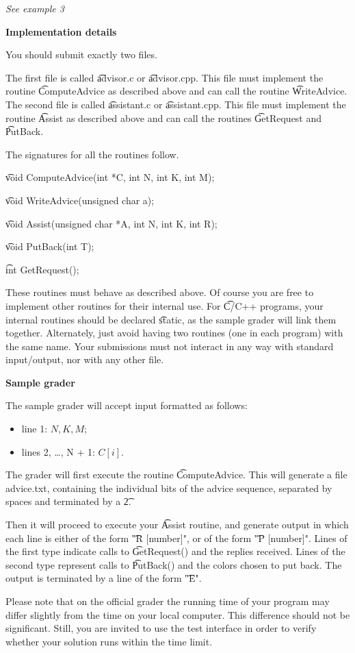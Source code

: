 \textit{See example 3}

\bf{Implementation details}

You should submit exactly two files. 

The first file is called \t{advisor.c} or \t{advisor.cpp}. This file must implement the routine \t{ComputeAdvice} as described above and can call the routine \t{WriteAdvice}. The second file is called \t{assistant.c} or \t{assistant.cpp}. This file must implement the routine \t{Assist} as described above and can call the routines \t{GetRequest} and \t{PutBack}.

The signatures for all the routines follow.

\t{void ComputeAdvice(int *C, int N, int K, int M);}

\t{void WriteAdvice(unsigned char a);}

\t{void Assist(unsigned char *A, int N, int K, int R);}

\t{void PutBack(int T);}

\t{int GetRequest();}

These routines must behave as described above. Of course you are free to implement other routines for their internal use. For \t{C/C++} programs, your internal routines should be declared \t{static}, as the sample grader will link them together. Alternately, just avoid having two routines (one in each program) with the same name. Your submissions must not interact in any way with standard input/output, nor with any other file.

\bf{Sample grader}

The sample grader will accept input formatted as follows:
\begin{itemize}
\item line 1: $N, K, M$;
\item lines 2, \dots, N + 1: $C[i]$.
\end{itemize}

The grader will first execute the routine \t{ComputeAdvice}. This will generate a file advice.txt, containing the individual bits of the advice sequence, separated by spaces and terminated by a \t{2}.

Then it will proceed to execute your \t{Assist} routine, and generate output in which each line is either of the form \t{"R [number]"}, or of the form \t{"P [number]"}. Lines of the first type indicate calls to \t{GetRequest()} and the replies received. Lines of the second type represent calls to \t{PutBack()} and the colors chosen to put back. The output is terminated by a line of the form \t{"E"}.

Please note that on the official grader the running time of your program may differ slightly from the time on your local computer. This difference should not be significant. Still, you are invited to use the test interface in order to verify whether your solution runs within the time limit.

